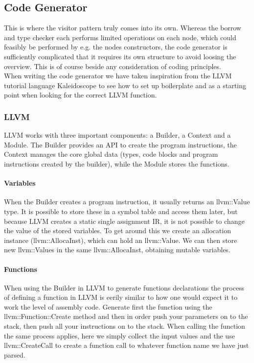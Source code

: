 \subsection{Code Generator}
\label{sec:CodeGenImplement}
This is where the visitor pattern truly comes into its own. Whereas the borrow and type checker each performs limited operations on each node, which could feasibly be performed by e.g. the nodes constructors, the code generator is sufficiently complicated that it requires its own structure to avoid loosing the overview. This is of course beside any consideration of coding principles.\\
When writing the code generator we have taken inspiration from the LLVM tutorial language Kaleidoscope \cite{LLVMTutorial} to see how to set up boilerplate and as a starting point when looking for the correct LLVM function.

\subsubsection{LLVM}
LLVM works with three important components: a Builder, a Context and a Module. The Builder provides an API to create the program instructions, the Context manages the core global data (types, code blocks and program instructions created by the builder), while the Module stores the functions.


\paragraph*{Variables}
When the Builder creates a program instruction, it usually returns an llvm::Value type. It is possible to store these in a symbol table and access them later, but because LLVM creates a static single assignment IR, it is not possible to change the value of the stored variables. To get around this we create an allocation instance (llvm::AllocaInst), which can hold an llvm::Value. We can then store new llvm::Values in the same llvm::AllocaInst, obtaining mutable variables.

\paragraph*{Functions}
When using the Builder in LLVM to generate functions declarations the process of
defining a function in LLVM is eerily similar to how one would expect it to work the
level of assembly code. Generate first the function using the llvm::Function::Create
method and then in order push your parameters on to the stack, then push all your
instructions on to the stack. When calling the function the same process applies,
here we simply collect the input values and the use llvm::CreateCall to create a
function call to whatever function name we have just parsed. \\

